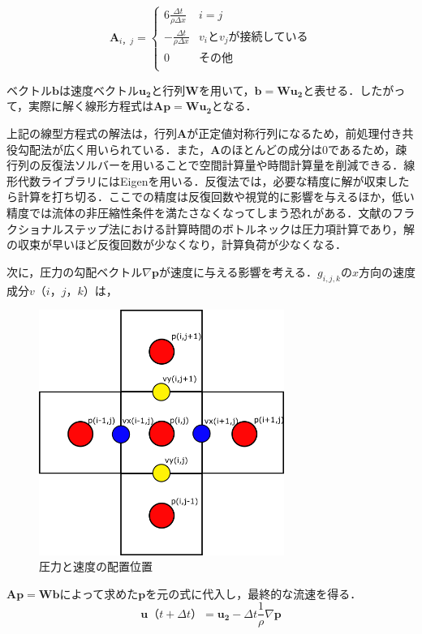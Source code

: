 \documentclass[a4j,12pt]{jreport}
\begin{document}
\[
	\mathbf{A}_{i，j} = 
	\begin{cases}
 	6\frac{\varDelta t}{\rho \varDelta x} 	& i = j\\
 	-\frac{\varDelta t}{\rho \varDelta x}   	& v_iとv_jが接続している\\
 	0  							& その他\\
	\end{cases}
\]

ベクトル$\bm{b}$は速度ベクトル$\bm{u_2}$と行列$\mathbf{W}$を用いて，$\bm{b} = \mathbf{W}\bm{u_2}$と表せる．したがって，実際に解く線形方程式は$\mathbf{A}\bm{p} = \mathbf{W}\bm{u_2}$となる．

上記の線型方程式の解法は，行列$\mathbf{A}$が正定値対称行列になるため，前処理付き共役勾配法が広く用いられている．また，$\mathbf{A}$のほとんどの成分は$0$であるため，疎行列の反復法ソルバーを用いることで空間計算量や時間計算量を削減できる．線形代数ライブラリにはEigenを用いる．反復法では，必要な精度に解が収束したら計算を打ち切る．ここでの精度は反復回数や視覚的に影響を与えるほか，低い精度では流体の非圧縮性条件を満たさなくなってしまう恐れがある．文献\cite{fedkiw}のフラクショナルステップ法における計算時間のボトルネックは圧力項計算であり，解の収束が早いほど反復回数が少なくなり，計算負荷が少なくなる．

次に，圧力の勾配ベクトル$\nabla\bm{p}$が速度に与える影響を考える．$g_{i,j,k}$の$x$方向の速度成分$v（i，j，k）$は，
\begin{figure}[H]
\begin{center}
\includegraphics[width=80mm]{images/P2V.png}
\caption{圧力と速度の配置位置}
\label{fig:pressure_model}
\end{center}
\end{figure}
$\mathbf{A}\bm{p} = \mathbf{W}\bm{b}$によって求めた$\bm{p}$を元の式に代入し，最終的な流速を得る．
\[
	\bm{u} （t + \varDelta t）=  \bm{u_2} - \varDelta t \frac{1}{\rho}\nabla \bm{p} 
\]
\end{document}
